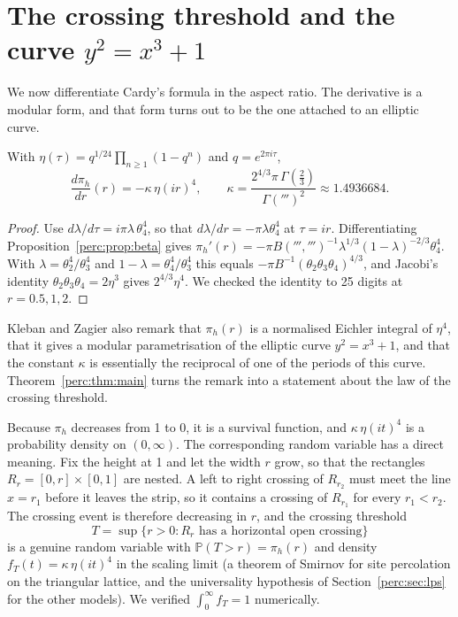 \section{The crossing threshold and the curve \texorpdfstring{$y^2=x^3+1$}{y2 = x3 + 1}}

We now differentiate Cardy's formula in the aspect ratio. The derivative is a modular form, and that form turns out to be the one attached to an elliptic curve.

\begin{proposition}\label{perc:prop:kz}
With $\eta(\tau) = q^{1/24}\prod_{n\ge1}(1-q^n)$ and $q = e^{2\pi i\tau}$,
\[
\frac{d\pi_h}{dr}(r) = -\kappa\,\eta(ir)^4,\qquad
\kappa = \frac{2^{4/3}\pi\,\Gamma(\tfrac23)}{\Gamma(\third)^2}\approx1.4936684.
\]
\end{proposition}
\begin{proof}
Use $d\lambda/d\tau = i\pi\lambda\,\theta_4^4$, so that $d\lambda/dr = -\pi\lambda\theta_4^4$ at $\tau = ir$. Differentiating Proposition~\ref{perc:prop:beta} gives $\pi_h'(r) = -\pi B(\third,\third)^{-1}\lambda^{1/3}(1-\lambda)^{-2/3}\theta_4^4$. With $\lambda = \theta_2^4/\theta_3^4$ and $1-\lambda = \theta_4^4/\theta_3^4$ this equals $-\pi B^{-1}(\theta_2\theta_3\theta_4)^{4/3}$, and Jacobi's identity $\theta_2\theta_3\theta_4 = 2\eta^3$ gives $2^{4/3}\eta^4$. We checked the identity to 25 digits at $r = 0.5, 1, 2$.
\end{proof}

Kleban and Zagier \cite{klebanzagier2003} also remark that $\pi_h(r)$ is a normalised Eichler integral of $\eta^4$, that it gives a modular parametrisation of the elliptic curve $y^2=x^3+1$, and that the constant $\kappa$ is essentially the reciprocal of one of the periods of this curve. Theorem~\ref{perc:thm:main} turns the remark into a statement about the law of the crossing threshold.

Because $\pi_h$ decreases from 1 to 0, it is a survival function, and $\kappa\,\eta(it)^4$ is a probability density on $(0,\infty)$. The corresponding random variable has a direct meaning. Fix the height at 1 and let the width $r$ grow, so that the rectangles $R_r = [0,r]\times[0,1]$ are nested. A left to right crossing of $R_{r_2}$ must meet the line $x = r_1$ before it leaves the strip, so it contains a crossing of $R_{r_1}$ for every $r_1<r_2$. The crossing event is therefore decreasing in $r$, and the crossing threshold
\[
T = \sup\{r>0: R_r\text{ has a horizontal open crossing}\}
\]
is a genuine random variable with $\mathbb{P}(T>r) = \pi_h(r)$ and density $f_T(t) = \kappa\,\eta(it)^4$ in the scaling limit (a theorem of Smirnov for site percolation on the triangular lattice, and the universality hypothesis of Section~\ref{perc:sec:lps} for the other models). We verified $\int_0^\infty f_T = 1$ numerically.

